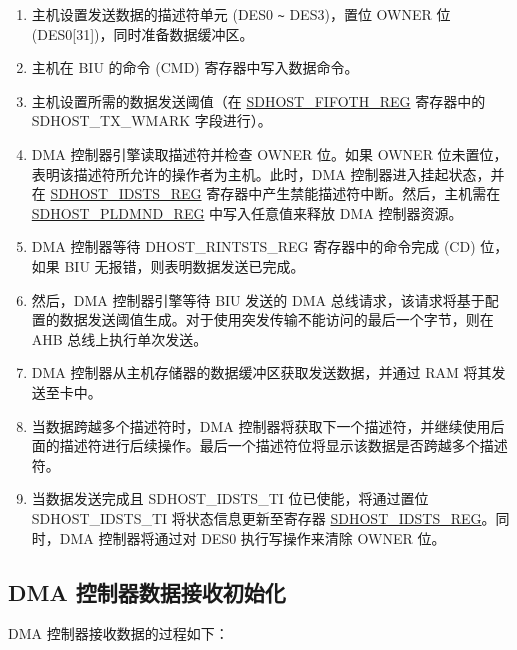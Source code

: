 \documentclass[main\_\_CN.tex]{subfiles}
\begin{document}
\begin{enumerate}
\item 主机设置发送数据的描述符单元 (DES0 \verb+~+ DES3)，置位 OWNER 位 (DES0[31])，同时准备数据缓冲区。
\item 主机在 BIU 的命令 (CMD) 寄存器中写入数据命令。
\item 主机设置所需的数据发送阈值（在 \hyperref[regdesc:FIFOTHREG]{SDHOST\_FIFOTH\_REG} 寄存器中的 SDHOST\_TX\_WMARK 字段进行）。
\item DMA 控制器引擎读取描述符并检查 OWNER 位。如果 OWNER 位未置位，表明该描述符所允许的操作者为主机。此时，DMA 控制器进入挂起状态，并在 \hyperref[regdesc:IDSTSREG]{SDHOST\_IDSTS\_REG} 寄存器中产生禁能描述符中断。然后，主机需在 \hyperref[regdesc:PLDMNDREG]{SDHOST\_PLDMND\_REG} 中写入任意值来释放 DMA 控制器资源。
\item DMA 控制器等待 DHOST\_RINTSTS\_REG 寄存器中的命令完成 (CD) 位，如果 BIU 无报错，则表明数据发送已完成。
\item 然后，DMA 控制器引擎等待 BIU 发送的 DMA 总线请求，该请求将基于配置的数据发送阈值生成。对于使用突发传输不能访问的最后一个字节，则在 AHB 总线上执行单次发送。
\item DMA 控制器从主机存储器的数据缓冲区获取发送数据，并通过 RAM 将其发送至卡中。
\item 当数据跨越多个描述符时，DMA 控制器将获取下一个描述符，并继续使用后面的描述符进行后续操作。最后一个描述符位将显示该数据是否跨越多个描述符。
\item 当数据发送完成且 SDHOST\_IDSTS\_TI 位已使能，将通过置位 SDHOST\_IDSTS\_TI 将状态信息更新至寄存器 \hyperref[regdesc:IDSTSREG]{SDHOST\_IDSTS\_REG}。同时，DMA 控制器将通过对 DES0 执行写操作来清除 OWNER 位。
\end{enumerate}

\subsection{DMA 控制器数据接收初始化}

DMA 控制器接收数据的过程如下：
\end{document}
